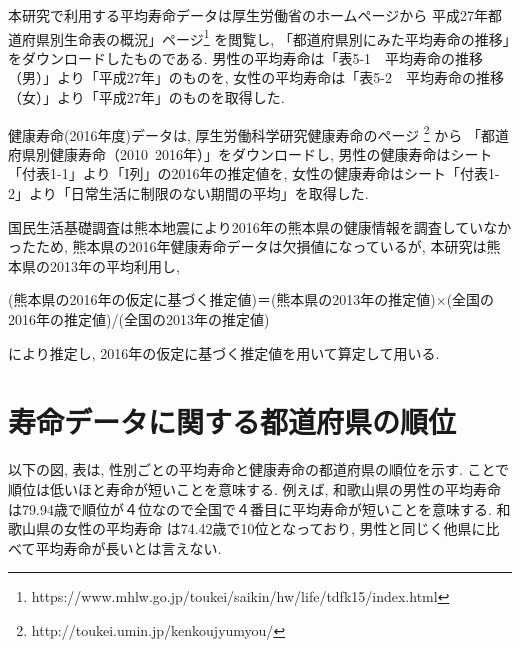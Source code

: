 本研究で利用する平均寿命データは厚生労働省のホームページから
平成27年都道府県別生命表の概況」ページ\footnote{https://www.mhlw.go.jp/toukei/saikin/hw/life/tdfk15/index.html}
を閲覧し,
「都道府県別にみた平均寿命の推移」をダウンロードしたものである.
男性の平均寿命は「表5-1　平均寿命の推移（男）」より「平成27年」のものを, 女性の平均寿命は「表5-2　平均寿命の推移（女）」より「平成27年」のものを取得した.


健康寿命(2016年度)データは,
厚生労働科学研究健康寿命のページ
\footnote{http://toukei.umin.jp/kenkoujyumyou/}
から
「都道府県別健康寿命（2010~2016年）」をダウンロードし,
男性の健康寿命はシート「付表1-1」より「I列」の2016年の推定値を, 女性の健康寿命はシート「付表1-2」より「日常生活に制限のない期間の平均」を取得した.

国民生活基礎調査は熊本地震により2016年の熊本県の健康情報を調査していなかったため,
熊本県の2016年健康寿命データは欠損値になっているが,
本研究は熊本県の2013年の平均利用し,

\begin{center}
	(熊本県の2016年の仮定に基づく推定値)＝(熊本県の2013年の推定値)×(全国の2016年の推定値)/(全国の2013年の推定値)
\end{center}

により推定し, 2016年の仮定に基づく推定値を用いて算定して用いる.




\newpage

\section{寿命データに関する都道府県の順位}

以下の図, 表は, 性別ごとの平均寿命と健康寿命の都道府県の順位を示す.
ことで順位は低いほと寿命が短いことを意味する.
例えば, 和歌山県の男性の平均寿命
は79.94歳で順位が４位なので全国で４番目に平均寿命が短いことを意味する.
和歌山県の女性の平均寿命
は74.42歳で10位となっており,
男性と同じく他県に比べて平均寿命が長いとは言えない.


